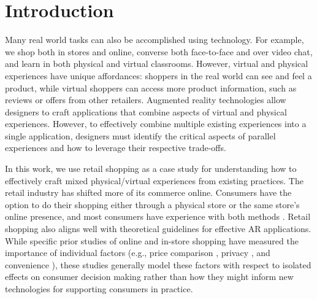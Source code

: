 \section{Introduction}

Many real world tasks can also be accomplished using technology.  For example, we shop both in stores and online, converse both face-to-face and over video chat, and learn in both physical and virtual classrooms. However, virtual and physical experiences have unique affordances: shoppers in the real world can see and feel a product, while virtual shoppers can access more product information, such as reviews or offers from other retailers. Augmented reality technologies allow designers to craft applications that combine aspects of virtual and physical experiences. However, to effectively combine multiple existing experiences into a single application, designers must identify the critical aspects of parallel experiences and how to leverage their respective trade-offs. 

In this work, we use retail shopping as a case study for understanding how to effectively craft mixed physical/virtual experiences from existing practices. The retail industry has shifted more of its commerce online.  Consumers have the option to do their shopping either through a physical store or the same store's online presence, and most consumers have experience with both methods \cite{nyt}. Retail shopping also aligns well with theoretical guidelines for effective AR applications.    While specific prior studies of online and in-store shopping have measured the importance of individual factors (e.g., price comparison \cite{karlsson2005price}, privacy \cite{miyazaki2001consumer}, and convenience \cite{bednarz2010perceptions}), these studies generally model these factors with respect to isolated effects on consumer decision making rather than how they might inform new technologies for supporting consumers in practice.  

